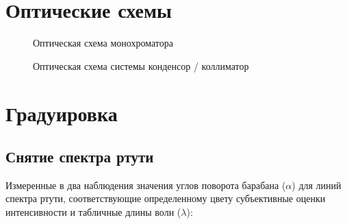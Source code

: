 \documentclass[a4paper]{article}
\begin{document}
		\newpage
		
	\section*{Оптические схемы}
	
		\begin{figure}[h]
			
			\vskip -0.5cm
			
			\caption{Оптическая схема монохроматора}
			
			\raisebox{-.5\height}{%
				\texttt{[image: 1]}%
			}
		
			\vskip 0.5cm
		
			\caption{Оптическая схема системы конденсор / коллиматор}
	
			\raisebox{-.5\height}{%
				\texttt{[image: 2]}%
			}
			
		\end{figure}
	
		\newpage

	\section*{Градуировка}
	
		\subsection*{Снятие спектра ртути}
		
		Измеренные в два наблюдения значения углов поворота барабана ($ \alpha $) для линий спектра ртути, соответствующие определенному цвету субъективные оценки интенсивности и табличные длины волн ($ \lambda $):
		
\end{document}

